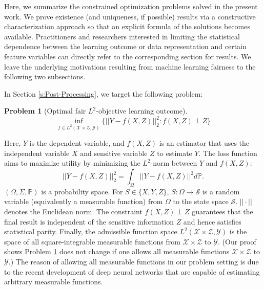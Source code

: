 \documentclass[twoside,11pt]{article}
\newtheorem{prob}{Problem}
\begin{document}
Here, we summarize the constrained optimization problems solved in the present work. We prove existence (and uniqueness, if possible) results via a constructive characterization approach so that an explicit formula of the solutions becomes available. Practitioners and researchers interested in limiting the statistical dependence between the learning outcome or data representation and certain feature variables can directly refer to the corresponding section for results. We leave the underlying motivations resulting from machine learning fairness to the following two subsections. 

In Section \ref{s:Post-Processing}, we target the following problem: \begin{prob}[Optimal fair $L^2$-objective learning outcome]\label{prob:Optimal Fair $L^2$-objective Learning Outcome}
\begin{equation} \label{eq:post-processing constrained optimization for optimal learning outcome}
\inf_{f \in L^2(\mathcal{X} \times \mathcal{Z},\mathcal{Y})} \{||Y - f(X,Z)||_2^2 : f(X,Z) \perp Z\}
\end{equation}
\end{prob}
Here, $Y$ is the dependent variable, and $f(X,Z)$ is an estimator that uses the independent variable $X$ and sensitive variable $Z$ to estimate $Y$. The loss function aims to maximize utility by minimizing the $L^2$-norm between $Y$ and $f(X,Z)$: $$||Y - f(X,Z)||_2^2 = \int_{\Omega} ||Y - f(X,Z)||^2 d\mathbb{P}.$$ $(\Omega,\Sigma,\mathbb{P})$ is a probability space. For $S \in \{X,Y,Z\}$, $S: \Omega \rightarrow \mathcal{S}$ is a random variable (equivalently a measurable function) from $\Omega$ to the state space $\mathcal{S}$. $||\cdot||$ denotes the Euclidean norm.  The constraint $f(X,Z) \perp Z$ guarantees that the final result is independent of the sensitive information $Z$ and hence satisfies statistical parity. Finally, the admissible function space $L^2(\mathcal{X} \times \mathcal{Z},\mathcal{Y})$ is the space of all square-integrable measurable functions from $\mathcal{X} \times \mathcal{Z}$ to $\mathcal{Y}$. (Our proof shows Problem \ref{prob:Optimal Fair $L^2$-objective Learning Outcome} does not change if one allows all measurable functions $\mathcal{X} \times \mathcal{Z}$ to $\mathcal{Y}$.) The reason of allowing all measurable functions in our problem setting is due to the recent development of deep neural networks that are capable of estimating arbitrary measurable functions.
\end{document}
